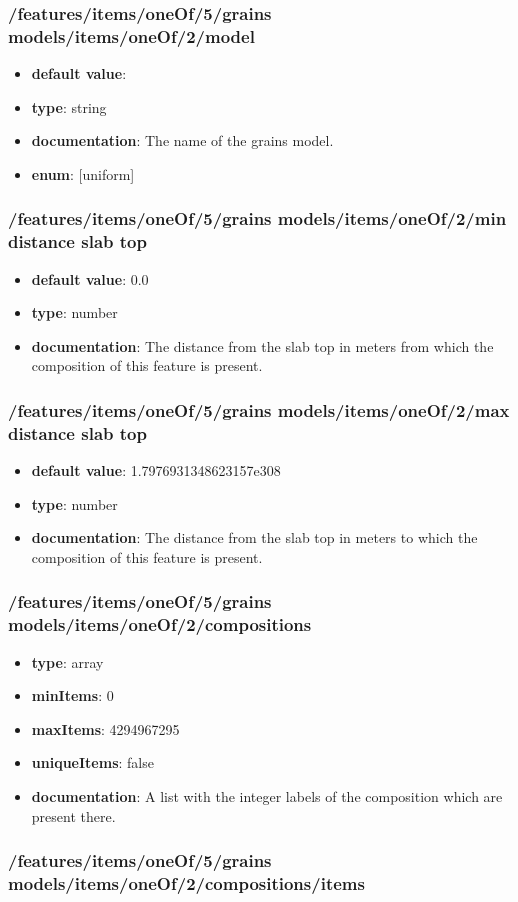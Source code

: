 \subsubsection{/features/items/oneOf/5/grains models/items/oneOf/2/model}
\begin{itemize}\item {\bf default value}: 
\item {\bf type}: string
\item {\bf documentation}: The name of the grains model.
\item {\bf enum}: [uniform]\end{itemize}\subsubsection{/features/items/oneOf/5/grains models/items/oneOf/2/min distance slab top}
\begin{itemize}\item {\bf default value}: 0.0
\item {\bf type}: number
\item {\bf documentation}: The distance from the slab top in meters from which the composition of this feature is present.
\end{itemize}\subsubsection{/features/items/oneOf/5/grains models/items/oneOf/2/max distance slab top}
\begin{itemize}\item {\bf default value}: 1.7976931348623157e308
\item {\bf type}: number
\item {\bf documentation}: The distance from the slab top in meters to which the composition of this feature is present.
\end{itemize}\subsubsection{/features/items/oneOf/5/grains models/items/oneOf/2/compositions}
\begin{itemize}\item {\bf type}: array
\item {\bf minItems}: 0
\item {\bf maxItems}: 4294967295
\item {\bf uniqueItems}: false
\item {\bf documentation}: A list with the integer labels of the composition which are present there.
\end{itemize}\subsubsection{/features/items/oneOf/5/grains models/items/oneOf/2/compositions/items}
